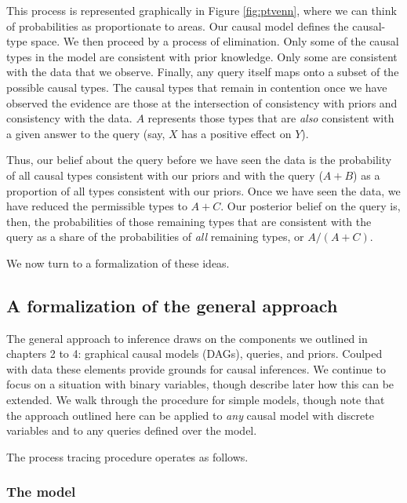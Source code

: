 \documentclass[
  12pt,
]{book}
\begin{document}
This process is represented graphically in Figure \ref{fig:ptvenn}, where we can think of probabilities as proportionate to areas. Our causal model defines the causal-type space. We then proceed by a process of elimination. Only some of the causal types in the model are consistent with prior knowledge. Only some are consistent with the data that we observe. Finally, any query itself maps onto a subset of the possible causal types. The causal types that remain in contention once we have observed the evidence are those at the intersection of consistency with priors and consistency with the data. \(A\) represents those types that are \emph{also} consistent with a given answer to the query (say, \(X\) has a positive effect on \(Y\)).

Thus, our belief about the query before we have seen the data is the probability of all causal types consistent with our priors and with the query (\(A + B\)) as a proportion of all types consistent with our priors. Once we have seen the data, we have reduced the permissible types to \(A + C\). Our posterior belief on the query is, then, the probabilities of those remaining types that are consistent with the query as a share of the probabilities of \emph{all} remaining types, or \(A/(A+C)\).

We now turn to a formalization of these ideas.

\hypertarget{a-formalization-of-the-general-approach}{%
\subsection{A formalization of the general approach}\label{a-formalization-of-the-general-approach}}

The general approach to inference draws on the components we outlined in chapters 2 to 4: graphical causal models (DAGs), queries, and priors. Coulped with data these elements provide grounds for causal inferences. We continue to focus on a situation with binary variables, though describe later how this can be extended. We walk through the procedure for simple models, though note that the approach outlined here can be applied to \emph{any} causal model with discrete variables and to any queries defined over the model.

The process tracing procedure operates as follows.

\hypertarget{the-model}{%
\subsubsection{The model}\label{the-model}}
\end{document}
